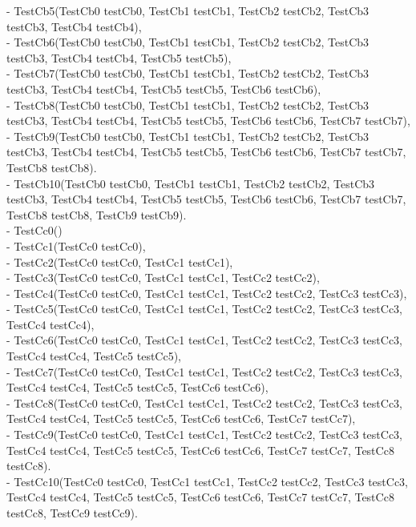 \documentclass[12pt]{article}
\begin{document}
- TestCb5(TestCb0 testCb0, TestCb1 testCb1, TestCb2 testCb2, TestCb3 testCb3, TestCb4 testCb4),\\
- TestCb6(TestCb0 testCb0, TestCb1 testCb1, TestCb2 testCb2, TestCb3 testCb3, TestCb4 testCb4, TestCb5 testCb5),\\
- TestCb7(TestCb0 testCb0, TestCb1 testCb1, TestCb2 testCb2, TestCb3 testCb3, TestCb4 testCb4, TestCb5 testCb5, TestCb6 testCb6),\\
- TestCb8(TestCb0 testCb0, TestCb1 testCb1, TestCb2 testCb2, TestCb3 testCb3, TestCb4 testCb4, TestCb5 testCb5, TestCb6 testCb6, TestCb7 testCb7),\\
- TestCb9(TestCb0 testCb0, TestCb1 testCb1, TestCb2 testCb2, TestCb3 testCb3, TestCb4 testCb4, TestCb5 testCb5, TestCb6 testCb6, TestCb7 testCb7, TestCb8 testCb8).\\
- TestCb10(TestCb0 testCb0, TestCb1 testCb1, TestCb2 testCb2, TestCb3 testCb3, TestCb4 testCb4, TestCb5 testCb5, TestCb6 testCb6, TestCb7 testCb7, TestCb8 testCb8, TestCb9 testCb9).\\
- TestCc0()\\
- TestCc1(TestCc0 testCc0),\\
- TestCc2(TestCc0 testCc0, TestCc1 testCc1),\\
- TestCc3(TestCc0 testCc0, TestCc1 testCc1, TestCc2 testCc2),\\
- TestCc4(TestCc0 testCc0, TestCc1 testCc1, TestCc2 testCc2, TestCc3 testCc3),\\
- TestCc5(TestCc0 testCc0, TestCc1 testCc1, TestCc2 testCc2, TestCc3 testCc3, TestCc4 testCc4),\\
- TestCc6(TestCc0 testCc0, TestCc1 testCc1, TestCc2 testCc2, TestCc3 testCc3, TestCc4 testCc4, TestCc5 testCc5),\\
- TestCc7(TestCc0 testCc0, TestCc1 testCc1, TestCc2 testCc2, TestCc3 testCc3, TestCc4 testCc4, TestCc5 testCc5, TestCc6 testCc6),\\
- TestCc8(TestCc0 testCc0, TestCc1 testCc1, TestCc2 testCc2, TestCc3 testCc3, TestCc4 testCc4, TestCc5 testCc5, TestCc6 testCc6, TestCc7 testCc7),\\
- TestCc9(TestCc0 testCc0, TestCc1 testCc1, TestCc2 testCc2, TestCc3 testCc3, TestCc4 testCc4, TestCc5 testCc5, TestCc6 testCc6, TestCc7 testCc7, TestCc8 testCc8).\\
- TestCc10(TestCc0 testCc0, TestCc1 testCc1, TestCc2 testCc2, TestCc3 testCc3, TestCc4 testCc4, TestCc5 testCc5, TestCc6 testCc6, TestCc7 testCc7, TestCc8 testCc8, TestCc9 testCc9).\\
\end{document}
